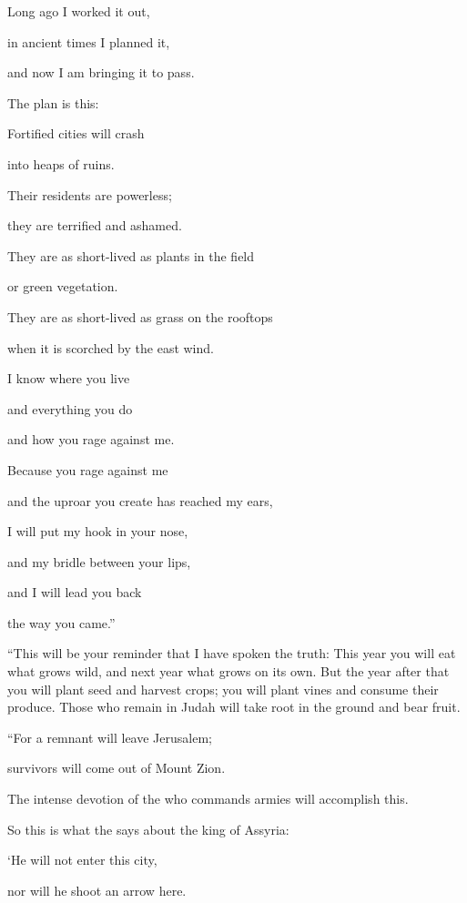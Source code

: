 {\par }{\Q Long
ago
I worked
it out,
\par }{\Q in ancient
times I planned
it,
\par }{\Q and now
I am bringing
it to pass.
\par }{\Q The plan is this:
\par }{\Q Fortified
cities
will crash
\par }{\Q into heaps
of ruins.
\par }{\Q {}Their residents
are powerless;
\par }{\Q they are terrified
and ashamed.
\par }{\Q They are as short-lived as plants
in the field
\par }{\Q or green
vegetation.
\par }{\Q They are as short-lived as grass
on the rooftops
\par }{\Q when it is scorched
by
the east wind.
\par }{\Q {}I know
where you live
\par }{\Q and everything you do
\par }{\Q and how you rage
against me.
\par }{\Q {}Because
you rage
against me
\par }{\Q and the uproar
you create
has reached my ears,
\par }{\Q I
will put
my hook
in your nose,
\par }{\Q and my bridle
between your lips,
\par }{\Q and I will lead you back
\par }{\Q the way
you came.”
\par }{\PP “This
will be your reminder
that I have spoken the truth: This year
you will eat
what grows
wild, and next
year
what grows on its own.
But the year
after
that you will plant seed
and harvest
crops; you will plant
vines
and consume
their produce.
Those who remain
in Judah
will take root
in the ground
and bear
fruit.
\par }{\Q {}“For
a remnant
will leave Jerusalem;
\par }{\Q survivors will
come out
of Mount
Zion.
\par }{\Q The intense
devotion of the
{}
who commands armies
will accomplish
this.
\par }{\Q {}So
this is what
the {}
says about the king
of Assyria:
\par }{\Q ‘He will not
enter
this
city,
\par }{\Q nor
will he shoot
an
arrow
here.

}
